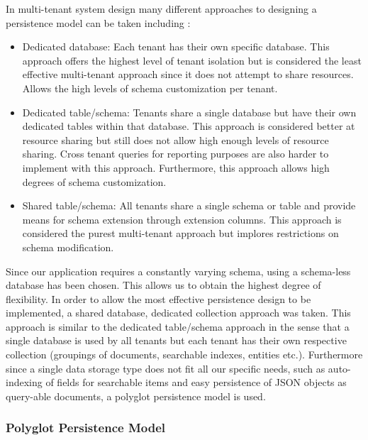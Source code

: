 In multi-tenant system design many different approaches to designing a persistence model can be taken including \cite{Krebs2012}:

\begin{itemize}
\item Dedicated database: Each tenant has their own specific database. This approach offers the highest level of tenant isolation but is considered the least effective multi-tenant approach since it does not attempt to share resources. Allows the high levels of schema customization per tenant.
\item Dedicated table/schema: Tenants share a single database but have their own dedicated tables within that database. This approach is considered better at resource sharing but still does not allow high enough levels of resource sharing. Cross tenant queries for reporting purposes are also harder to implement with this approach. Furthermore, this approach allows high degrees of schema customization.
\item Shared table/schema: All tenants share a single schema or table and provide means for schema extension through extension columns. This approach is considered the purest multi-tenant approach but implores restrictions on schema modification.
\end{itemize}


Since our application requires a constantly varying schema, using a schema-less database has been chosen. This allows us to obtain the highest degree of flexibility. In order to allow the most effective persistence design to be implemented, a shared database, dedicated collection approach was taken. This approach is similar to the dedicated table/schema approach in the sense that a single database is used by all tenants but each tenant has their own respective collection (groupings of documents, searchable indexes, entities etc.). Furthermore since a single data storage type does not fit all our specific needs, such as auto-indexing of fields for searchable items and easy persistence of JSON objects as query-able documents, a polyglot persistence model is used.


\subsubsection{\textbf{Polyglot Persistence Model}}

